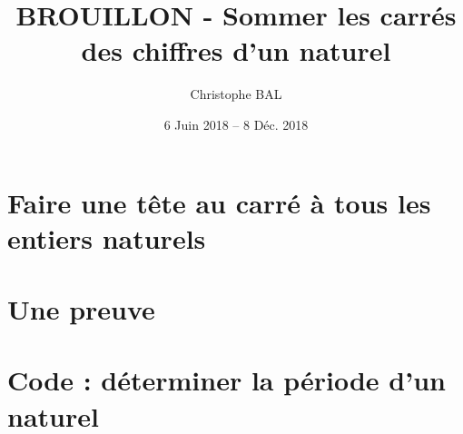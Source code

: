 \documentclass[12pt]{amsart}
\begin{document}
\title{BROUILLON - Sommer les carrés des chiffres d'un naturel}
\author{Christophe BAL}
\date{6 Juin 2018 -- 8 Déc. 2018}
\maketitle

\setcounter{tocdepth}{1}
\tableofcontents


\section{Faire une tête au carré à tous les entiers naturels}




\section{Une preuve}




\section{Code : déterminer la période d'un naturel}


\end{document}
